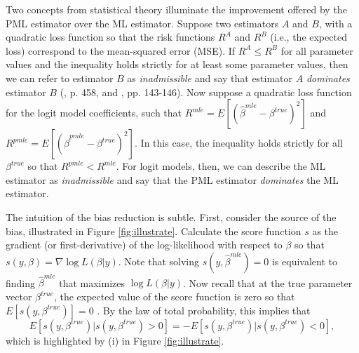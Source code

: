 \documentclass[12pt]{article}
\begin{document}
Two concepts from statistical theory illuminate the improvement offered by the PML estimator over the ML estimator. 
Suppose two estimators $A$ and $B$, with a quadratic loss function so that the risk functions $R^A$ and $R^B$ (i.e., the expected loss) correspond to the mean-squared error (MSE). 
If $R^A \leq R^B$ for all parameter values and the inequality holds strictly for at least some parameter values, then we can refer to estimator $B$ as \textit{inadmissible} and say that estimator $A$ \textit{dominates} estimator $B$ (\citealt{DeGrootSchervish2012}, p. 458, and \citealt{LeonardHsu1999}, pp. 143-146). 
Now suppose a quadratic loss function for the logit model coefficients, such that $R^{mle} = E[(\hat{\beta}^{mle} - \beta^{true})^2]$ and $R^{pmle} = E[(\hat{\beta}^{pmle} - \beta^{true})^2]$. 
In this case, the inequality holds strictly for all $\beta^{true}$ so that $R^{pmle} < R^{mle}$. For logit models, then, we can describe the ML estimator as \textit{inadmissible} and say that the PML estimator \textit{dominates} the ML estimator.

The intuition of the bias reduction is subtle. 
First, consider the source of the bias, illustrated in Figure \ref{fig:illustrate}.
Calculate the score function $s$ as the gradient (or first-derivative) of the log-likelihood with respect to $\beta$ so that $s(y, \beta) = \nabla \log L(\beta | y)$. 
Note that solving $s(y, \hat{\beta}^{mle}) = 0$ is equivalent to finding $\hat{\beta}^{mle}$ that maximizes $\log L(\beta | y)$. 
Now recall that at the true parameter vector $\beta^{true}$, the expected value of the score function is zero so that $E\left[ s(y, \beta^{true})\right] = 0$ \citep[p. 517]{Greene2012}.
By the law of total probability, this implies that 
\begin{equation}\label{eqn:cancel}
E\left[ s(y, \beta^{true}) | s(y, \beta^{true}) > 0 \right] =  -E\left[ s(y, \beta^{true}) | s(y, \beta^{true}) < 0 \right],  
\end{equation}
which is highlighted by (i) in Figure \ref{fig:illustrate}.
\end{document}
